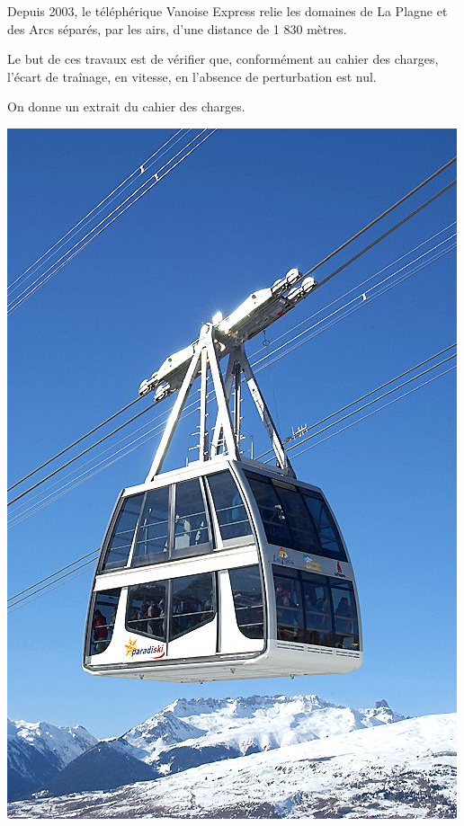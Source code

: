 \documentclass[10pt]{article}
\begin{document}
\begin{minipage}[c]{.8\linewidth}
Depuis 2003, le téléphérique Vanoise Express relie les domaines de La Plagne et des Arcs séparés, par les airs, d'une distance de 1 830 mètres.
\begin{obj} 
Le but de ces travaux est de vérifier que, conformément au cahier des charges, l'écart de traînage, en vitesse, en l'absence de perturbation est nul. 
\end{obj}

 On donne un extrait du cahier des charges.
 
\end{minipage} \hfill
\begin{minipage}[c]{.19\linewidth}
\begin{center}
\includegraphics[width=\textwidth]{images/ve}
\end{center}
\end{minipage}
\end{document}
